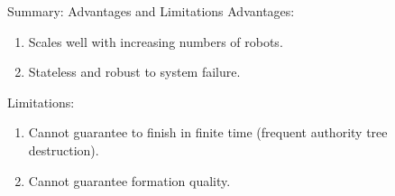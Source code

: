 \begin{frame}{Summary: Advantages and Limitations}
        Advantages:
            \begin{enumerate}
            \item Scales well with increasing numbers of robots.
            \item Stateless and robust to system failure.
            \end{enumerate}
        Limitations:
            \begin{enumerate}
            \item Cannot guarantee to finish in finite time (frequent authority tree destruction). 
            \item Cannot guarantee formation quality.
            \end{enumerate}

\end{frame}